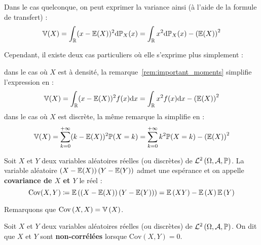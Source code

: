 \documentclass[../integ-proba.tex]{subfiles}
\begin{document}
    \begin{rem}
        Dans le cas quelconque, on peut exprimer la variance ainsi (à l'aide de la formule de transfert) :
        \begin{displaymath}
            \mathbb{V}(X) = \int_{\mathbb{R}} (x - \mathbb{E}(X))^2 \text{d}\mathbb{P}_X (x) = \int_{\mathbb{R}} x^2 \text{d}\mathbb{P}_X (x) - \left( \mathbb{E}(X) \right)^2
        \end{displaymath}

        Cependant, il existe deux cas particuliers où elle s'exprime plus simplement :
        \begin{itemize}
            \itemb dans le cas où $X$ est à densité, la remarque~\ref{rem:important_moments} simplifie l'expression en :
            \begin{displaymath}
                \mathbb{V}(X) = \int_{\mathbb{R}} (x - \mathbb{E}(X))^2 f(x) \text{d}x = \int_{\mathbb{R}} x^2 f(x) \text{d} x - \left( \mathbb{E}(X) \right)^2
            \end{displaymath}
            \itemb dans le cas où $X$ est discrète, la même remarque la simplifie en :
            \begin{displaymath}
                \mathbb{V}(X) = \sum_{k=0}^{+\infty} (k - \mathbb{E}(X))^2 \mathbb{P}(X=k) = \sum_{k=0}^{+\infty} k^2 \mathbb{P}(X=k) - \left( \mathbb{E}(X) \right)^2
            \end{displaymath}
        \end{itemize}
    \end{rem}

    \begin{defi}
        Soit $X$ et $Y$ deux variables aléatoires réelles (ou discrètes) de $\mathcal{L}^2\left( \Omega, \mathcal{A}, \mathbb{P} \right)$.
        La variable aléatoire $\left( X - \mathbb{E}(X) \right)\left( Y - \mathbb{E}(Y) \right)$ admet une espérance et on appelle \textbf{covariance de $X$ et $Y$} le réel :
        \begin{displaymath}
            \text{Cov}(X, Y) \coloneqq \mathbb{E} \left( \left( X - \mathbb{E}(X) \right)\left( Y - \mathbb{E}(Y) \right) \right) = \mathbb{E}\left(XY\right) - \mathbb{E}\left(X\right)\mathbb{E}\left( Y \right)
        \end{displaymath}
    \end{defi}

    \begin{rem}
        Remarquons que $\text{Cov}\left( X,X \right) = \mathbb{V}\left( X \right)$.
    \end{rem}


    \begin{defi}
        Soit $X$ et $Y$ deux variables aléatoires réelles (ou discrètes) de $\mathcal{L}^2\left( \Omega, \mathcal{A}, \mathbb{P} \right)$.
        On dit que $X$ et $Y$ sont \textbf{non-corrélées} lorsque $\text{Cov}\left( X, Y \right) = 0$.
    \end{defi}
\end{document}
